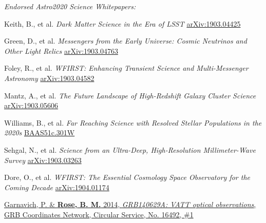 \documentclass[margin]{res}
\begin{document}
\begin{resume}
\textit{Endorsed Astro2020 Science Whitepapers:}

\vspace{-12pt}\hspace{15pt}\hangindent=30pt 
Keith, B., et al. \textit{Dark Matter Science in the Era of LSST}
\href{https://ui.adsabs.harvard.edu/abs/2019arXiv190304425B/abstract}{arXiv:1903.04425}

\vspace{-12pt}\hspace{15pt}\hangindent=30pt 
Green, D., et al. \textit{Messengers from the Early Universe: Cosmic Neutrinos and Other Light Relics}
\href{https://ui.adsabs.harvard.edu/abs/2019arXiv190304763G/abstract}{arXiv:1903.04763}

\vspace{-12pt}\hspace{15pt}\hangindent=30pt 
Foley, R., et al. \textit{WFIRST: Enhancing Transient Science and Multi-Messenger Astronomy}
\href{https://ui.adsabs.harvard.edu/abs/2019arXiv190304582F/abstract}{arXiv:1903.04582}

\vspace{-12pt}\hspace{15pt}\hangindent=30pt
Mantz, A., et al. \textit{The Future Landscape of High-Redshift Galaxy Cluster Science}
\href{https://ui.adsabs.harvard.edu/abs/2019BAAS...51c.279M/abstract}{arXiv:1903.05606}

\vspace{-12pt}\hspace{15pt}\hangindent=30pt 
Williams, B., et al. \textit{Far Reaching Science with Resolved Stellar Populations in the 2020s}
\href{https://ui.adsabs.harvard.edu/abs/2019BAAS...51c.301W/abstract}{BAAS51c.301W}

\vspace{-12pt}\hspace{15pt}\hangindent=30pt 
Sehgal, N., et al. \textit{Science from an Ultra-Deep, High-Resolution Millimeter-Wave Survey}
\href{https://ui.adsabs.harvard.edu/abs/2019arXiv190303263S/abstract}{arXiv:1903.03263}

\vspace{-12pt}\hspace{15pt}\hangindent=30pt 
Dore, O., et al. \textit{WFIRST: The Essential Cosmology Space Observatory for the Coming Decade}
\href{https://ui.adsabs.harvard.edu/abs/2019arXiv190401174D/abstract}{arXiv:1904.01174}

\vspace{-12pt}
\hangindent=15pt \href{https://ui.adsabs.harvard.edu/abs/2014GCN..16492...1G/abstract}{Garnavich, P. \& {\bf Rose, B. M.} 2014, {\sl GRB140629A: VATT optical observations}, GRB Coordinates Network, Circular Service, No. 16492, \#1}





\end{resume}
\end{document}
